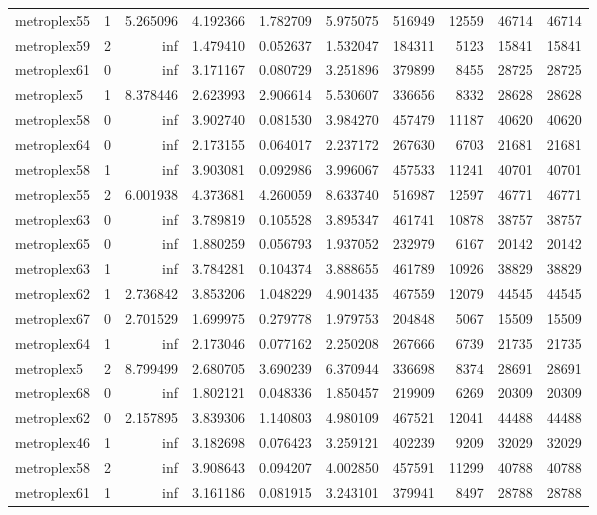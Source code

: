 \begin{longtable}{|l|r|r|r|r|r|r|r|r|r|}
metroplex55 & 1 & 5.265096 & 4.192366 & 1.782709 & 5.975075 & 516949 & 12559 & 46714 & 46714 \\
metroplex59 & 2 & inf & 1.479410 & 0.052637 & 1.532047 & 184311 & 5123 & 15841 & 15841 \\
metroplex61 & 0 & inf & 3.171167 & 0.080729 & 3.251896 & 379899 & 8455 & 28725 & 28725 \\
metroplex5 & 1 & 8.378446 & 2.623993 & 2.906614 & 5.530607 & 336656 & 8332 & 28628 & 28628 \\
metroplex58 & 0 & inf & 3.902740 & 0.081530 & 3.984270 & 457479 & 11187 & 40620 & 40620 \\
metroplex64 & 0 & inf & 2.173155 & 0.064017 & 2.237172 & 267630 & 6703 & 21681 & 21681 \\
metroplex58 & 1 & inf & 3.903081 & 0.092986 & 3.996067 & 457533 & 11241 & 40701 & 40701 \\
metroplex55 & 2 & 6.001938 & 4.373681 & 4.260059 & 8.633740 & 516987 & 12597 & 46771 & 46771 \\
metroplex63 & 0 & inf & 3.789819 & 0.105528 & 3.895347 & 461741 & 10878 & 38757 & 38757 \\
metroplex65 & 0 & inf & 1.880259 & 0.056793 & 1.937052 & 232979 & 6167 & 20142 & 20142 \\
metroplex63 & 1 & inf & 3.784281 & 0.104374 & 3.888655 & 461789 & 10926 & 38829 & 38829 \\
metroplex62 & 1 & 2.736842 & 3.853206 & 1.048229 & 4.901435 & 467559 & 12079 & 44545 & 44545 \\
metroplex67 & 0 & 2.701529 & 1.699975 & 0.279778 & 1.979753 & 204848 & 5067 & 15509 & 15509 \\
metroplex64 & 1 & inf & 2.173046 & 0.077162 & 2.250208 & 267666 & 6739 & 21735 & 21735 \\
metroplex5 & 2 & 8.799499 & 2.680705 & 3.690239 & 6.370944 & 336698 & 8374 & 28691 & 28691 \\
metroplex68 & 0 & inf & 1.802121 & 0.048336 & 1.850457 & 219909 & 6269 & 20309 & 20309 \\
metroplex62 & 0 & 2.157895 & 3.839306 & 1.140803 & 4.980109 & 467521 & 12041 & 44488 & 44488 \\
metroplex46 & 1 & inf & 3.182698 & 0.076423 & 3.259121 & 402239 & 9209 & 32029 & 32029 \\
metroplex58 & 2 & inf & 3.908643 & 0.094207 & 4.002850 & 457591 & 11299 & 40788 & 40788 \\
metroplex61 & 1 & inf & 3.161186 & 0.081915 & 3.243101 & 379941 & 8497 & 28788 & 28788 \\

\end{longtable}
